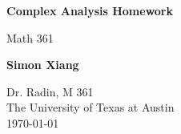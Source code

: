 \documentclass{article}
\begin{document}
\begin{titlepage}
    \begin{center}
        \vspace*{1cm}
 
        \Huge
        \textbf{Complex Analysis Homework}
 
        \vspace{0.5cm}
        \LARGE
        Math 361

        \vspace{1.5cm}
 
        \textbf{Simon Xiang}
 
        \vfill
  
        \vspace{0.8cm}
 
        \Large
    	Dr. Radin, M 361\\
        The University of Texas at Austin\\
        \today
 
    \end{center}
\end{titlepage}
    
\end{document}
